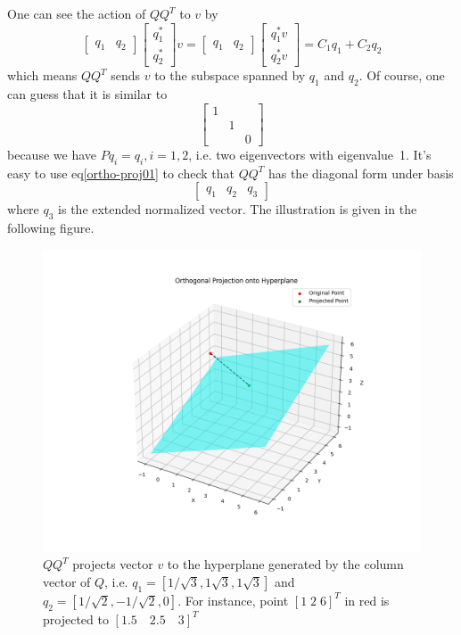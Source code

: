 \documentclass[11pt]{article}
\begin{document}
One can see the action of $QQ^{T}$ to $v$ by
\begin{equation}
\label{ortho-proj01}
\begin{bmatrix}
   q_{1} & q_{2}
\end{bmatrix} \begin{bmatrix}
   q_{1}^{*}\\
   q_{2}^{*}
\end{bmatrix} v = 
\begin{bmatrix}
   q_{1} & q_{2}
\end{bmatrix} \begin{bmatrix}
   q_{1}^{*}v\\
   q_{2}^{*}v 
\end{bmatrix} = C_{1} q_{1} + C_{2} q_{2}
\end{equation}
which means $QQ^{T}$ sends $v$ to the subspace spanned by $q_{1}$ and $q_{2}$. Of course, one can guess that it is similar to 
$$
\begin{bmatrix}
   1 & & \\
   & 1 & \\
   & & 0
\end{bmatrix}
$$
because we have $P q_{i} = q_{i}, i=1,2$, i.e. two eigenvectors with eigenvalue~1. It's easy to use eq\eqref{ortho-proj01} to check that $QQ^{T}$ has the diagonal form under basis
$$
\begin{bmatrix}
   q_{1} & q_{2} & q_{3}
\end{bmatrix}
$$
where $q_{3}$ is the extended normalized vector.  
The illustration is given in the following figure.
\begin{figure}[ht]
   \centering
   \includegraphics[width=0.6\linewidth]{../illustrations/orthogonal_projection.png}
   \caption{$QQ^{T}$ projects vector $v$ to the hyperplane generated by the column vector of $Q$, i.e. $q_{1}=[1/\sqrt{3}, 1\sqrt{3}, 1\sqrt{3}]$ and $q_{2}=[1/\sqrt{2}, -1/\sqrt{2}, 0]$. For instance, point $[1\; 2\; 6]^{T}$ in red is projected to $[1.5\quad 2.5\quad 3]^{T}$}
   \label{fig:enter-label2}
\end{figure}
\end{document}

